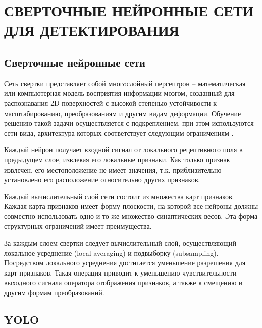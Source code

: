 \chapter{СВЕРТОЧНЫЕ НЕЙРОННЫЕ СЕТИ ДЛЯ ДЕТЕКТИРОВАНИЯ}

\section{Сверточные нейронные сети}


Сеть свертки представляет собой многoслойный персептрон -- математическая или компьютерная модель восприятия информации мозгом, созданный для распознавания 2D-поверхностей с высокой степенью устойчивости к масштабированию, преобразованиям и другим видам деформации. Обучение решению такой задачи осуществляется с подкреплением, при этом используются сети вида, архитектура которых соответствует следующим ограничениям .

Каждый нейрон получает входной сигнал от локального рецептивного поля в предыдущем слое, извлекая его локальные признаки. Как только признак извлечен, его местоположение не имеет значения, т.к. приблизительно установлено его расположение относительно других признаков.

Каждый вычислительный слой сети состоит из множества карт признаков. Каждая карта признаков имеет форму плоскости, на которой все нейроны должны совместно использовать одно и то же множество синаптических весов. Эта форма структурных ограничений имеет преимущества.

За каждым слоем свертки следует вычислительный слой, осуществляющий локальное усреднение (local averaging) и подвыборку (subsampling). Посредством локального усреднения достигается уменьшение разрешения для карт признаков. Такая операция приводит к уменьшению чувствительности выходного сигнала оператора отображения признаков, а также к смещению и другим формам преобразований.


\section{YOLO}

